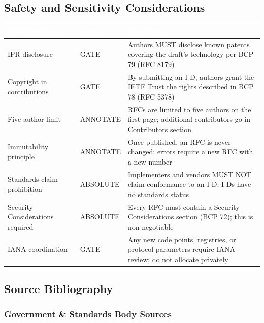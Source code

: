 \documentclass[11pt,letterpaper]{article}
\newcommand{\tableheader}[1]{\textbf{\sffamily\textcolor{white}{#1}}}
\begin{document}
\subsection{Safety and Sensitivity Considerations}

\begin{center}
\begin{tabularx}{\textwidth}{L{4cm}L{2.5cm}X}
\toprule
{}
\tableheader{Consideration} & \tableheader{Type} & \tableheader{Guidance} \\
\midrule
IPR disclosure & GATE & Authors MUST disclose known patents covering the draft's technology per BCP 79 (RFC 8179) \\
Copyright in contributions & GATE & By submitting an I-D, authors grant the IETF Trust the rights described in BCP 78 (RFC 5378) \\
Five-author limit & ANNOTATE & RFCs are limited to five authors on the first page; additional contributors go in Contributors section \\
Immutability principle & ANNOTATE & Once published, an RFC is never changed; errors require a new RFC with a new number \\
Standards claim prohibition & ABSOLUTE & Implementers and vendors MUST NOT claim conformance to an I-D; I-Ds have no standards status \\
Security Considerations required & ABSOLUTE & Every RFC must contain a Security Considerations section (BCP 72); this is non-negotiable \\
IANA coordination & GATE & Any new code points, registries, or protocol parameters require IANA review; do not allocate privately \\
\bottomrule
\end{tabularx}
\end{center}

\subsection{Source Bibliography}

\subsubsection{Government \& Standards Body Sources}
\end{document}
